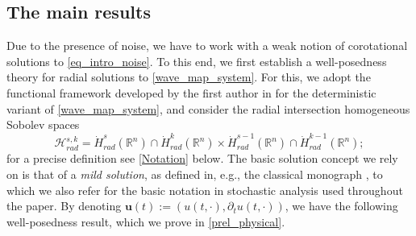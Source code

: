 \documentclass[12pt,reqno]{amsart}
\theoremstyle{plain}
\theoremstyle{remark}
\theoremstyle{plain}
\theoremstyle{definition}
\numberwithin{equation}{section}
\numberwithin{equation}{section}
\def\R{{\mathbb R}}
\begin{document}
	\subsection{The main results}
	Due to the presence of noise, we have to work with a weak notion of corotational solutions to \eqref{eq_intro_noise}. To this end, we first establish a well-posedness theory for radial solutions to \eqref{wave_map_system}. For this, we adopt the functional framework developed by the first author in \cite{glogic2025globally} for the deterministic variant of \eqref{wave_map_system}, and consider the radial intersection homogeneous Sobolev spaces 
	\begin{equation*}
		\mathcal{H}^{s,k}_{rad}=\dot{H}^s_{rad}(\R^n)\cap \dot{H}^k_{rad}(\R^n)\times \dot{H}^{s-1}_{rad}(\R^n)\cap \dot{H}^{k-1}_{rad}(\R^n);
	\end{equation*} for a precise definition see \autoref{Notation} below. The basic solution concept we rely on is that of a \emph{mild solution}, as defined in, e.g., the classical monograph \cite{da2014stochastic}, to which we also refer for the basic notation in stochastic analysis used throughout the  paper. By denoting $\mathbf{u}(t):=(u(t,\cdot),\partial_t u(t,\cdot))$, we have the following well-posedness result, which we prove in \autoref{prel_physical}.
\end{document}

